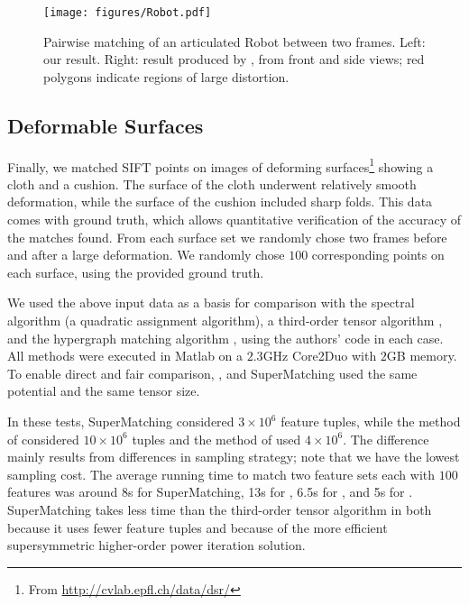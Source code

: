 \begin{figure}[t!]
\centering
  \texttt{[image: figures/Robot.pdf]}
  \caption{Pairwise matching of an articulated Robot between two frames.
           Left: our result. Right: result produced by \cite{Chang09}, from front and side views; red polygons indicate regions of large distortion.}
\label{fig:3DRobot}
\end{figure}

\subsection{Deformable Surfaces}
\label{subsec:2DDeformable}

Finally, we matched SIFT points on images of deforming surfaces\footnote{From \url{http://cvlab.epfl.ch/data/dsr/}} showing a cloth and a cushion.
The surface of the cloth underwent relatively smooth deformation, while the surface of the cushion included sharp folds.
This data comes with ground truth, which allows quantitative verification of the accuracy of the matches found.
From each surface set we randomly chose two frames before and after a large deformation.
We randomly chose $100$ corresponding points on each surface, using the provided ground truth.

We used the above input data as a basis for comparison with the spectral algorithm \cite{Cour06} (a quadratic assignment algorithm),
a third-order tensor algorithm \cite{Duchenne09,Duchenne2011},
and the hypergraph matching algorithm \cite{Zass08}, using the authors' code in each case.
All methods were executed in Matlab on a $2.3$GHz Core2Duo with $2$GB memory.
To enable direct and fair comparison,
\cite{Duchenne09,Duchenne2011}, \cite{Zass08} and SuperMatching used the same potential and the same tensor size.

In these tests, SuperMatching considered $3\times 10^6$ feature tuples, while the method of \cite{Duchenne09,Duchenne2011} considered $10\times 10^6$ tuples  and the method of \cite{Zass08} used $4\times 10^6$.
The difference mainly results from differences in sampling strategy; note that we have the lowest sampling cost.
The average running time to match two feature sets each with $100$ features was around 8s for SuperMatching, 13s for \cite{Duchenne09}, 6.5s for \cite{Zass08}, and 5s for \cite{Cour06}.
SuperMatching takes less time than the third-order tensor algorithm in \cite{Duchenne09,Duchenne2011} both because it uses fewer feature tuples and because of the more efficient supersymmetric higher-order power iteration solution.

